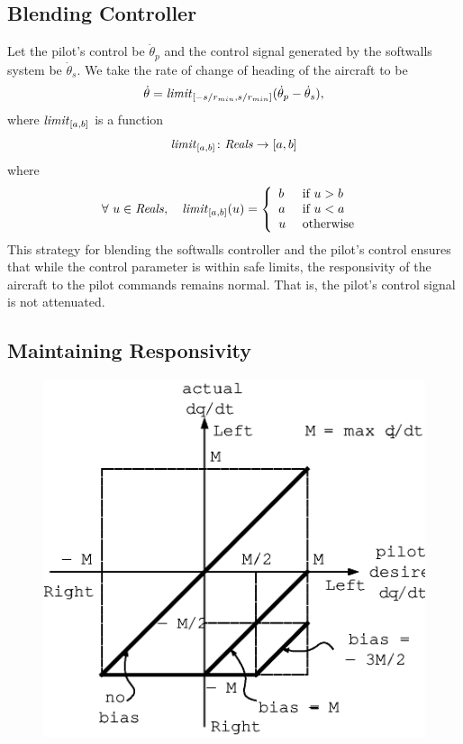 \documentclass[11pt]{article}
\begin{document}
\subsection{Blending Controller}

Let the pilot's control be $\dot{\theta}_p$ and the control signal
generated by the softwalls system be $\dot{\theta}_s$.
We take the rate of change of heading of the aircraft to
be
\[
\dot{\theta} = \mbox{\textit{limit}}_{[-s/r_{min}, s/r_{min}]}
(\dot{\theta}_p - \dot{\theta}_s ),
\]
where $\mbox{\textit{limit}}_{[a,b]}$ is a function
\[
\mbox{\textit{limit}}_{[a,b]} \colon \mbox{\textit{Reals}} \to [a, b]
\]
where
\[
\forall ~ u \in \mbox{\textit{Reals}}, \quad
\mbox{\textit{limit}}_{[a,b]}(u) = \left \{
\begin{array}{ll}
b&\mbox{ if } u > b\\
a&\mbox{ if } u < a\\
u&\mbox{ otherwise }
\end{array}
\right .
\]
This strategy for blending the softwalls controller and the
pilot's control ensures that while the control parameter is within
safe limits, the responsivity of the aircraft to the pilot
commands remains normal.
That is, the pilot's control signal is not attenuated.

\subsection{Maintaining Responsivity}

\begin{figure}[btp]
\centering
\includegraphics{bias.eps}
\end{figure}
\end{document}
